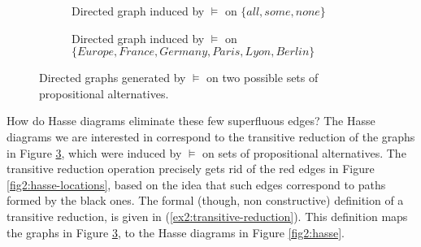 \begin{figure}[H]
	\centering
	\begin{subfigure}[t]{.45\linewidth}
		\centering
		\caption{Directed graph induced by $\vDash$ on $\lbrace \textit{all}, \textit{some}, \textit{none} \rbrace$}\label{fig2:entailment-graph-scalar}
	\end{subfigure}	
	\hfill
	\begin{subfigure}[t]{.45\linewidth}
		\centering
		\caption{Directed graph induced by $\vDash$ on $\lbrace \textit{Europe}, \textit{France}, \textit{Germany}, \textit{Paris}, \textit{Lyon}, \textit{Berlin} \rbrace$}\label{fig2:entailment-graph-locations}
	\end{subfigure}
	\caption{Directed graphs generated by $\vDash$ on two possible sets of propositional alternatives.}\label{ex2:graph-entailment}
\end{figure}

How do Hasse diagrams eliminate these few superfluous edges? The Hasse diagrams we are interested in correspond to the transitive reduction of the graphs in Figure \ref{ex2:graph-entailment}, which were induced by $\vDash$ on sets of propositional alternatives. The transitive reduction operation precisely gets rid of the red edges in Figure \ref{fig2:hasse-locations}, based on the idea that such edges correspond to paths formed by the black ones. The formal (though, non constructive) definition of a transitive reduction, is given in (\ref{ex2:transitive-reduction}). This definition maps the graphs in Figure \ref{ex2:graph-entailment}, to the Hasse diagrams in Figure \ref{fig2:hasse}.

\begin{exe}
	\label{ex2:transitive-reduction}
\end{exe}

